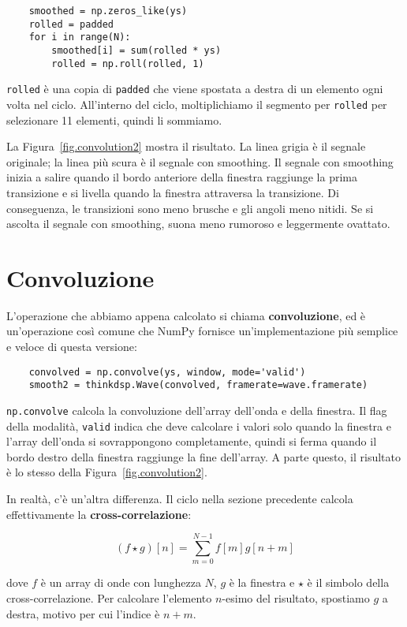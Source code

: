 \documentclass[12pt,a4paper]{book}
\begin{document}
\begin{verbatim} 
    smoothed = np.zeros_like(ys)
    rolled = padded
    for i in range(N):
        smoothed[i] = sum(rolled * ys)
        rolled = np.roll(rolled, 1)
 \end{verbatim} 

{\tt rolled} è una copia di {\tt padded} che viene spostata a destra di un elemento ogni volta nel ciclo. All'interno del ciclo, moltiplichiamo il segmento per {\tt rolled} per selezionare 11 elementi, quindi li sommiamo.

La Figura~\ref{fig.convolution2} mostra il risultato. La linea grigia è il segnale originale; la linea più scura è il segnale con smoothing. Il segnale con smoothing inizia a salire quando il bordo anteriore della finestra raggiunge la prima transizione e si livella quando la finestra attraversa la transizione. Di conseguenza, le transizioni sono meno brusche e gli angoli meno nitidi. Se si ascolta il segnale con smoothing, suona meno rumoroso e leggermente ovattato.

\section{Convoluzione} \label{convolution} 

L'operazione che abbiamo appena calcolato si chiama {\bf convoluzione}, ed è un'operazione così comune che NumPy fornisce un'implementazione più semplice e veloce di questa versione:

\begin{verbatim} 
    convolved = np.convolve(ys, window, mode='valid')
    smooth2 = thinkdsp.Wave(convolved, framerate=wave.framerate)
 \end{verbatim} 

{\tt np.convolve} calcola la convoluzione dell'array dell'onda e della finestra. Il flag della modalità, {\tt valid} indica che deve calcolare i valori solo quando la finestra e l'array dell'onda si sovrappongono completamente, quindi si ferma quando il bordo destro della finestra raggiunge la fine dell'array. A parte questo, il risultato è lo stesso della Figura~\ref{fig.convolution2}.

\newcommand{\conv}{\ast}

In realtà, c'è un'altra differenza. Il ciclo nella sezione precedente calcola effettivamente la {\bf cross-correlazione}:

%
\[ (f \star g)[n] = \sum_{m=0}^{N-1} f[m] g[n+m] \] 

%
dove $f$ è un array di onde con lunghezza $N$, $g$ è la finestra e $\star$ è il simbolo della cross-correlazione. Per calcolare l'elemento $n$-esimo del risultato, spostiamo $g$ a destra, motivo per cui l'indice è $n+m$.
\end{document}
